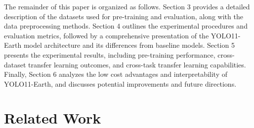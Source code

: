 \documentclass{article}
\begin{document}
The remainder of this paper is organized as follows. 
Section 3 provides a detailed description of the datasets used for pre-training and evaluation, 
along with the data preprocessing methods. 
Section 4 outlines the experimental procedures and evaluation metrics, followed by a comprehensive 
presentation of the YOLO11-Earth model architecture and its differences from baseline models. 
Section 5 presents the experimental results, including pre-training performance, cross-dataset 
transfer learning outcomes, and cross-task transfer learning capabilities. 
Finally, Section 6 analyzes the low cost advantages and interpretability of YOLO11-Earth, and discusses potential improvements and future directions. 


\section{Related Work}
\end{document}
